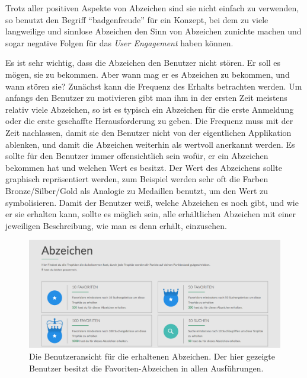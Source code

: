 \documentclass[12pt,twoside]{book}
\begin{document}
Trotz aller positiven Aspekte von Abzeichen sind sie nicht einfach zu verwenden, so benutzt \citep[pp. 56]{zichermann2011gamification} den Begriff ``badgenfreude'' für ein Konzept, bei dem zu viele langweilige und sinnlose Abzeichen den Sinn von Abzeichen zunichte machen und sogar negative Folgen für das \textit{User Engagement} haben können.

Es ist sehr wichtig, dass die Abzeichen den Benutzer nicht stören. Er soll es mögen, sie zu bekommen. Aber wann mag er es Abzeichen zu bekommen, und wann stören sie?
Zunächst kann die Frequenz des Erhalts betrachten werden. Um anfangs den Benutzer zu motivieren gibt man ihm in der ersten Zeit meistens relativ viele Abzeichen, so ist es typisch ein Abzeichen für die erste Anmeldung oder die erste geschaffte Herausforderung zu geben.
Die Frequenz muss mit der Zeit nachlassen, damit sie den Benutzer nicht von der eigentlichen Applikation ablenken, und damit die Abzeichen weiterhin als wertvoll anerkannt werden.
Es sollte für den Benutzer immer offensichtlich sein wofür, er ein Abzeichen bekommen hat und welchen Wert es besitzt. Der Wert des Abzeichens sollte graphisch repräsentiert werden, zum Beispiel werden sehr oft die Farben Bronze/Silber/Gold als Analogie zu Medaillen benutzt, um den Wert zu symbolisieren.
Damit der Benutzer weiß, welche Abzeichen es noch gibt, und wie er sie erhalten kann, sollte es möglich sein, alle erhältlichen Abzeichen mit einer jeweiligen Beschreibung, wie man es denn erhält, einzusehen.

\begin{figure}[htbp]
    \centering
    \includegraphics[width=1.0\textwidth]{images/infoboard_badges.png}
    \caption{Die Benutzeransicht für die erhaltenen Abzeichen. Der hier gezeigte Benutzer besitzt die Favoriten-Abzeichen in allen Ausführungen.}
    \label{fig:badges}
\end{figure}
\end{document}
